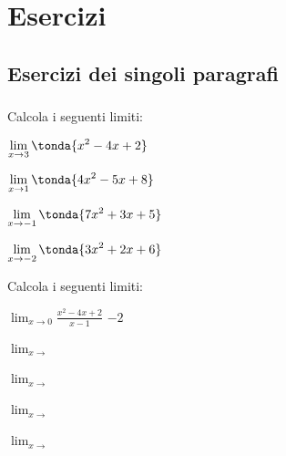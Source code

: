 
\section{Esercizi}

\subsection{Esercizi dei singoli paragrafi}

\subsubsection*{}

\begin{esercizio}\label{ese:03.1}
Calcola i seguenti limiti:
 \begin{enumeratea}
  \item \(\displaystyle \lim_{x \rightarrow 3} \tonda{x^2-4x+2}\)
  \item \(\displaystyle \lim_{x \rightarrow 1} \tonda{4x^2-5x+8}\)
  \item \(\displaystyle \lim_{x \rightarrow -1} \tonda{7x^2+3x+5}\)
  \item \(\displaystyle \lim_{x \rightarrow -2} \tonda{3x^2+2x+6}\)
 \end{enumeratea}
\end{esercizio}

\begin{esercizio}\label{ese:03.1}
Calcola i seguenti limiti:
 \begin{enumeratea}
  \item \(\displaystyle \lim_{x \rightarrow 0} \frac{x^2-4x+2}{x-1}\)
  \hfill \(-2\)
  \item \(\displaystyle \lim_{x \rightarrow } \frac{}{}\)
  \hfill \(\frac{}{}\)
  \item \(\displaystyle \lim_{x \rightarrow } \frac{}{}\)
  \hfill \(\frac{}{}\)
  \item \(\displaystyle \lim_{x \rightarrow } \frac{}{}\)
  \hfill \(\frac{}{}\)
  \item \(\displaystyle \lim_{x \rightarrow } \frac{}{}\)
  \hfill \(\frac{}{}\)
 \end{enumeratea}
\end{esercizio}

\begin{comment}
\subsection{Esercizi riepilogativi}

\begin{esercizio}
\label{ese:D.19}
testo esercizio
\end{esercizio}

\begin{esercizio}\label{ese:03.1}
Consegna:
 \begin{enumeratea}
  \item  
 \end{enumeratea}
\end{esercizio}
\end{comment}
